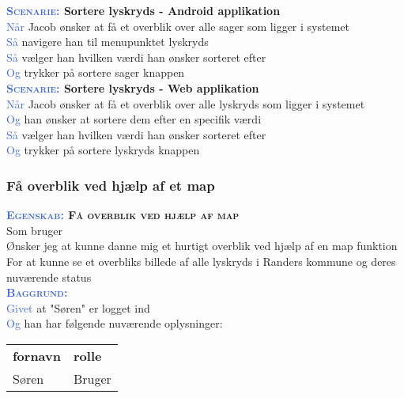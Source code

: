 \textbf{\textsc{\textcolor{RoyalBlue}{Scenarie:}} Sortere lyskryds - Android applikation}\\
\textcolor{RoyalBlue}{Når} Jacob ønsker at få et overblik over alle sager som ligger i systemet\\
\textcolor{RoyalBlue}{Så} navigere han til menupunktet lyskryds\\
\textcolor{RoyalBlue}{Så} vælger han hvilken værdi han ønsker sorteret efter\\
\textcolor{RoyalBlue}{Og} trykker på sortere sager knappen\\

\textbf{\textsc{\textcolor{RoyalBlue}{Scenarie:}} Sortere lyskryds - Web applikation}\\
\textcolor{RoyalBlue}{Når} Jacob ønsker at få et overblik over alle lyskryds som ligger i systemet\\
\textcolor{RoyalBlue}{Og} han ønsker at sortere dem efter en specifik værdi\\
\textcolor{RoyalBlue}{Så} vælger han hvilken værdi han ønsker sorteret efter\\
\textcolor{RoyalBlue}{Og} trykker på sortere lyskryds knappen\\

\subsubsection{Få overblik ved hjælp af et map}
\textbf{\textsc{\textcolor{RoyalBlue}{Egenskab:} Få overblik ved hjælp af map}}\\
Som bruger\\
Ønsker jeg at kunne danne mig et hurtigt overblik ved hjælp af en map funktion\\
For at kunne se et overbliks billede af alle lyskryds i Randers kommune  og deres nuværende status\\

\textsc{\textcolor{RoyalBlue}{\textbf{Baggrund:}}}\\
\textcolor{RoyalBlue}{Givet} at "Søren" er logget ind\\
\textcolor{RoyalBlue}{Og} han har følgende nuværende oplysninger:\\
\begin{tabular}{| l | l |}
	\textbf{fornavn} & \textbf{rolle} \\
	Søren & Bruger\\
\end{tabular}
\newline \newline
\clearpage

